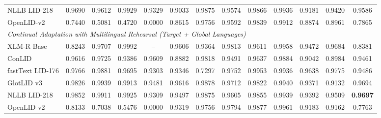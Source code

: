 \documentclass[11pt]{article}
\begin{document}
\begin{table}[p]
{\begin{tabular}{l ccc cccccccc c}
NLLB LID-218       & 0.9690 & 0.9612 & 0.9929 & 0.9329 & 0.9033 & 0.9875 & 0.9574 & 0.9866 & 0.9936 & 0.9181 & 0.9420 & 0.9586 \\
OpenLID-v2         & 0.7440 & 0.5081 & 0.4720 & 0.0000 & 0.8615 & 0.9756 & 0.9592 & 0.9839 & 0.9912 & 0.8874 & 0.8961 & 0.7865 \\
\midrule
\multicolumn{13}{l}{\textit{Continual Adaptation with Multilingual Rehearsal (Target + Global Languages)}} \\
XLM-R Base         & 0.8243 & 0.9707 & 0.9992 & -- & 0.9606 & 0.9364 & 0.9813 & 0.9611 & 0.9958 & 0.9472 & 0.9684 & 0.8381 \\
ConLID             & 0.9616 & 0.9725 & 0.9386 & 0.9609 & 0.8882 & 0.9818 & 0.9491 & 0.9637 & 0.9884 & 0.9042 & 0.8984 & 0.9461 \\
fastText LID-176   & 0.9766 & 0.9881 & 0.9695 & 0.9303 & 0.9346 & 0.7297 & 0.9752 & 0.9953 & 0.9936 & 0.9638 & 0.9775 & 0.9486 \\
GlotLID v3         & 0.9826 & 0.9939 & 0.9913 & 0.9481 & 0.9616 & 0.9878 & 0.9712 & 0.9822 & 0.9940 & 0.9371 & 0.9132 & 0.9694 \\
NLLB LID-218       & 0.9852 & 0.9911 & 0.9925 & 0.9309 & 0.9497 & 0.9875 & 0.9605 & 0.9855 & 0.9939 & 0.9392 & 0.9509 & \textbf{0.9697} \\
OpenLID-v2         & 0.8133 & 0.7038 & 0.5476 & 0.0000 & 0.9319 & 0.9756 & 0.9794 & 0.9877 & 0.9961 & 0.9183 & 0.9162 & 0.7763 \\
\bottomrule
\end{tabular}%
}
\end{table}
\end{document}
